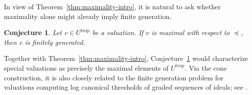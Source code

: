 \documentclass[reqno, 12pt]{amsart}
\newtheorem{conj}[prop]{Conjecture}
\theoremstyle{definition}
\newcommand{\bA}{\mathbb{A}}
\newcommand{\bk}{\mathbbm{k}}
\newcommand{\cF}{\mathcal{F}}
\newcommand{\Spec}{\mathrm{Spec}}
\newcommand{\gr}{\mathrm{gr}}
\newcommand{\wt}{\mathrm{wt}}
\newcommand{\trop}{\mathrm{trop}}
\numberwithin{equation}{section}
\begin{document}




In view of Theorem~\ref{thm:maximality-intro}, it is natural to ask whether
maximality alone might already imply finite generation.

\begin{conj}\label{conj:max-fg}
Let $v\in U^{\trop}$ be a valuation. If $v$ is maximal with respect to $\preceq$, then $v$ is finitely generated.
\end{conj}

Together with Theorem~\ref{thm:maximality-intro}, Conjecture~\ref{conj:max-fg}
would characterize special valuations as precisely the maximal elements
of $U^{\trop}$. Via the cone construction, it is also closely related to
the finite generation problem for valuations computing log canonical
thresholds of graded sequences of ideals; see
\cite[Question~6.24]{Zhu25}.





\end{document}

